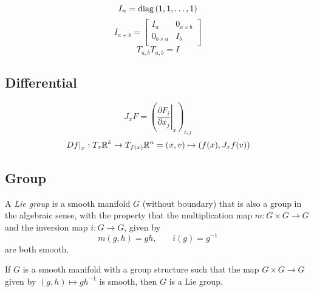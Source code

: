 \documentclass[stu, babel, american, biblatex, a4paper, leqno, draftall]{apa7}
\begin{document}
\begin{equation}\label{Matrix:Identity:Value}
    I_n=\operatorname{diag}{\left(1,1,\dots,1\right)}
\end{equation}
\begin{equation}\label{Matrix:Identity:Block}
    I_{a+b}=
    \begin{bmatrix}
        I_a           & 0_{a\times b} \\
        0_{b\times a} & I_b           \\
    \end{bmatrix}
\end{equation}
\begin{equation}\label{Matrix:Permutation:Square}
    T_{a,b} T_{a,b}= I
\end{equation}

\subsection{Differential}
\begin{equation}
    J_xF = \left(\left.\frac{\partial F_i}{\partial x_j}\right|_x\right)_{i,j}
\end{equation}
\begin{equation}
    \left.Df\right|_x
    : T_x\mathbb{R}^k\to T_{f(x)}\mathbb{R}^n
    = \left(x,v\right) \mapsto \left(f(x),J_xf(v)\right)
\end{equation}

\subsection{Group}

\begin{definition}\label{Group:Lie}
    A \textit{Lie group} is a smooth manifold $G$ (without boundary)
    that is also a group in the algebraic sense,
    with the property that
    the multiplication map $m:G\times G\to G$
    and the inversion map $i:G\to G$, given by
    \begin{equation*}
        m\left(g,h\right)=gh\text{,}
        \quad\quad
        i\left(g\right)=g^{-1}
    \end{equation*}
    are both smooth.
\end{definition}

\begin{proposition}\label{Group:Lie:Assertion}
    If $G$ is a smooth manifold with a group structure such that the map $G\times G\to G$ given by $\left(g,h\right)\mapsto gh^{-1}$ is smooth, then $G$ is a Lie group.
\end{proposition}
\end{document}
